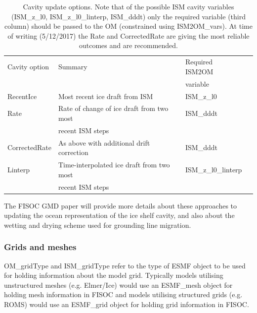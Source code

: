 \documentclass[12pt]{article}
\begin{document}
\begin{table}
  \begin{center}
    \begin{tabular}{ llll }
      Cavity option  & Summary                                    & Required ISM2OM \\
                     &                                            &  variable       \\
      \hline
      RecentIce      & Most recent ice draft from ISM             & ISM\_z\_l0      \\
      Rate           & Rate of change of ice draft from two most  & ISM\_dddt       \\
                     & recent ISM steps                           &                 \\
      CorrectedRate  & As above with additional drift correction  & ISM\_dddt       \\
      Linterp        & Time-interpolated ice draft from two most  & ISM\_z\_l0\_linterp \\
                     &  recent ISM steps                          &                  \\
    \end{tabular}
  \end{center}
  \caption{
    Cavity update options.  Note that of the possible ISM cavity variables 
    (ISM\_z\_l0, ISM\_z\_l0\_linterp, ISM\_dddt) only the required variable 
    (third column) should be passed to the OM (constrained using ISM2OM\_vars).
    At time of writing (5/12/2017) the Rate and CorrectedRate are giving 
    the most reliable outcomes and are recommended.
  }
  \label{tab:cavity}
\end{table}

The FISOC GMD paper will provide more  details about these approaches 
to updating the ocean 
representation of the ice shelf cavity, and also about the wetting and 
drying scheme used for grounding line migration.




\subsubsection{Grids and meshes}
OM\_gridType and ISM\_gridType refer to the type of ESMF object to be used for holding information about 
the model grid.  Typically models utilising unstructured meshes (e.g. Elmer/Ice) would use an 
ESMF\_mesh object for holding mesh information in FISOC and models utilising structured grids 
(e.g. ROMS) would use an ESMF\_grid object for holding grid information in FISOC.
\end{document}
